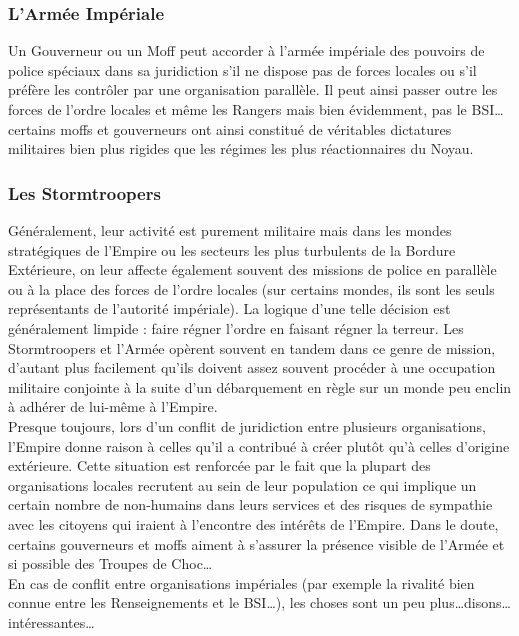 \documentclass[twoside]{article}
\begin{document}
\subsubsection{L'Armée Impériale}
Un Gouverneur ou un Moff peut accorder à l'armée impériale des pouvoirs de police spéciaux dans sa juridiction s'il ne dispose pas de forces locales ou s'il préfère les contrôler par une organisation parallèle. Il peut ainsi passer outre les forces de l'ordre locales et même les Rangers mais bien évidemment, pas le BSI\ldots certains moffs et gouverneurs ont ainsi constitué de véritables dictatures militaires bien plus rigides que les régimes les plus réactionnaires du Noyau.

\subsubsection{Les Stormtroopers}
Généralement, leur activité est purement militaire mais dans les mondes stratégiques de l'Empire ou les secteurs les plus turbulents de la Bordure Extérieure, on leur affecte également souvent des missions de police en parallèle ou à la place des forces de l'ordre locales (sur certains mondes, ils sont les seuls représentants de l'autorité impériale). La logique d'une telle décision est généralement limpide : faire régner l'ordre en faisant régner la terreur. Les Stormtroopers et l'Armée opèrent souvent en tandem dans ce genre de mission, d'autant plus facilement qu'ils doivent assez souvent procéder à une occupation militaire conjointe à la suite d'un débarquement en règle sur un monde peu enclin à adhérer de lui-même à l'Empire.\\

Presque toujours, lors d'un conflit de juridiction entre plusieurs organisations, l'Empire donne raison à celles qu'il a contribué à créer plutôt qu'à celles d'origine extérieure. Cette situation est renforcée par le fait que la plupart des organisations locales recrutent au sein de leur population ce qui implique un certain nombre de non-humains dans leurs services et des risques de sympathie avec les citoyens qui iraient à l'encontre des intérêts de l'Empire. Dans le doute, certains gouverneurs et moffs aiment à s'assurer la présence visible de l'Armée et si possible des Troupes de Choc\ldots\\

En cas de conflit entre organisations impériales (par exemple la rivalité bien connue entre les Renseignements et le BSI\ldots), les choses sont un peu plus\ldots disons\ldots intéressantes\ldots
\end{document}
